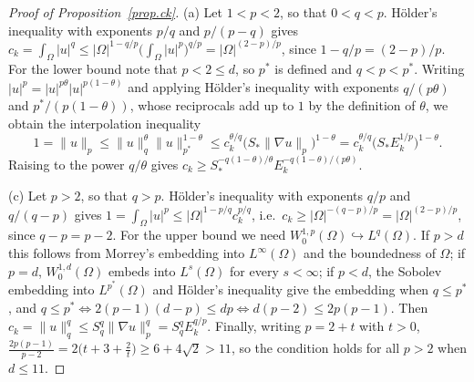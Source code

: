 \documentclass[10pt]{amsart}
\newenvironment{revblock}{\color{blue}}{}
\theoremstyle{definition}
\theoremstyle{remark}
\theoremstyle{plain}
\begin{document}
\begin{revblock}
\begin{proof}[Proof of Proposition~\ref{prop.ck}]
(a) Let $1<p<2$, so that $0<q<p$. H\"older's inequality with exponents $p/q$ and $p/(p-q)$ gives
$c_k=\int_\Omega|u|^q\le|\Omega|^{1-q/p}\big(\int_\Omega|u|^p\big)^{q/p}=|\Omega|^{(2-p)/p}$, since
$1-q/p=(2-p)/p$. For the lower bound note that $p<2\le d$, so $p^*$ is defined and $q<p<p^*$. Writing
$|u|^p=|u|^{p\theta}|u|^{p(1-\theta)}$ and applying H\"older's inequality with exponents
$q/(p\theta)$ and $p^*/(p(1-\theta))$, whose reciprocals add up to $1$ by the definition of $\theta$, we
obtain the interpolation inequality
\[
1=\|u\|_p\le\|u\|_q^{\theta}\|u\|_{p^*}^{1-\theta}\le c_k^{\theta/q}\big(S_*\|\nabla u\|_p\big)^{1-\theta}
=c_k^{\theta/q}\big(S_*E_k^{1/p}\big)^{1-\theta}.
\]
Raising to the power $q/\theta$ gives $c_k\ge S_*^{-q(1-\theta)/\theta}E_k^{-q(1-\theta)/(p\theta)}$.

(c) Let $p>2$, so that $q>p$. H\"older's inequality with exponents $q/p$ and $q/(q-p)$ gives
$1=\int_\Omega|u|^p\le|\Omega|^{1-p/q}c_k^{p/q}$, i.e.\ $c_k\ge|\Omega|^{-(q-p)/p}=|\Omega|^{(2-p)/p}$, since
$q-p=p-2$. For the upper bound we need $W^{1,p}_0(\Omega)\hookrightarrow L^q(\Omega)$. If $p>d$ this follows
from Morrey's embedding into $L^\infty(\Omega)$ and the boundedness of $\Omega$; if $p=d$,
$W^{1,d}_0(\Omega)$ embeds into $L^s(\Omega)$ for every $s<\infty$; if $p<d$, the Sobolev embedding into
$L^{p^*}(\Omega)$ and H\"older's inequality give the embedding when $q\le p^*$, and
$q\le p^*\iff2(p-1)(d-p)\le dp\iff d(p-2)\le2p(p-1)$. Then
$c_k=\|u\|_q^q\le S_q^q\|\nabla u\|_p^q=S_q^qE_k^{q/p}$. Finally, writing $p=2+t$ with $t>0$,
$\frac{2p(p-1)}{p-2}=2\big(t+3+\frac2t\big)\ge6+4\sqrt2>11$, so the condition holds for all $p>2$ when
$d\le11$.
\end{proof}
\end{revblock}
\end{document}
